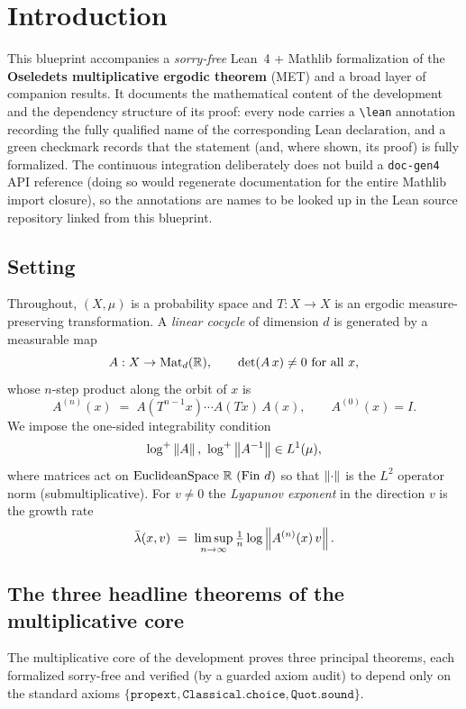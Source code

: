 \chapter{Introduction}

This blueprint accompanies a \emph{sorry-free} Lean~4 + Mathlib formalization of the
\textbf{Oseledets multiplicative ergodic theorem} (MET) and a broad layer of companion
results. It documents the mathematical content of the development and the dependency
structure of its proof: every node carries a \texttt{\textbackslash lean} annotation recording
the fully qualified name of the corresponding Lean declaration, and a green checkmark records
that the statement (and, where shown, its proof) is fully formalized. The continuous
integration deliberately does not build a \texttt{doc-gen4} API reference (doing so would
regenerate documentation for the entire Mathlib import closure), so the annotations are names
to be looked up in the Lean source repository linked from this blueprint.

\section{Setting}

Throughout, \((X, \mu)\) is a probability space and \(T : X \to X\) is an ergodic
measure-preserving transformation. A \emph{linear cocycle} of dimension \(d\) is generated
by a measurable map
\[
  A : X \to \mathrm{Mat}_{d}(\mathbb{R}), \qquad \det(A\,x) \neq 0 \text{ for all } x,
\]
whose \(n\)-step product along the orbit of \(x\) is
\[
  A^{(n)}(x) \;=\; A(T^{n-1}x)\cdots A(Tx)\,A(x), \qquad A^{(0)}(x) = I .
\]
We impose the one-sided integrability condition
\[
  \log^{+}\left\lVert A \right\rVert, \ \log^{+}\left\lVert A^{-1} \right\rVert \in L^{1}(\mu),
\]
where matrices act on \(\mathrm{EuclideanSpace}\ \R\ (\mathrm{Fin}\ d)\) so that
\(\left\lVert \cdot \right\rVert\) is the \(L^2\) operator norm (submultiplicative). For \(v \neq 0\) the
\emph{Lyapunov exponent} in the direction \(v\) is the growth rate
\[
  \bar\lambda(x, v) \;=\; \limsup_{n\to\infty} \tfrac1n \log \left\lVert A^{(n)}(x)\, v \right\rVert.
\]

\section{The three headline theorems of the multiplicative core}

The multiplicative core of the development proves three principal theorems, each
formalized sorry-free and verified
(by a guarded axiom audit) to depend only on the standard axioms
\(\{\texttt{propext}, \texttt{Classical.choice}, \texttt{Quot.sound}\}\).

